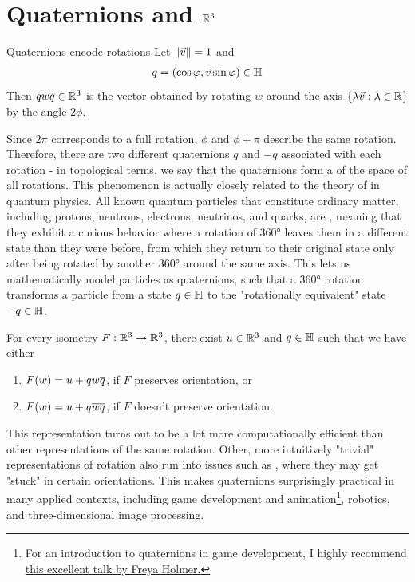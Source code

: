 \section{Quaternions and $\mathbb{R}^3$}
\begin{importanttheorem}{Quaternions encode rotations}{}
	Let $\norm{\vec{v}} = 1$ and
	\begin{align*}
		q = (\cos \varphi, \vec{v} \sin \varphi) \in \mathbb{H}
	\end{align*} 
	Then $q w \overline{{q}} \in \mathbb{R}^3$ is the vector obtained by rotating $w$ around the axis $\qty{\lambda\vec{v}: \lambda \in \mathbb{R}}$ by the angle $2\phi$.
\end{importanttheorem}
Since $2\pi$ corresponds to a full rotation, $\phi$ and $\phi + \pi$ describe the same rotation. Therefore, there are two different quaternions $q$ and $-q$ associated with each rotation - in topological terms, we say that the quaternions form a  of the space of all rotations. 
\newpar
This phenomenon is actually closely related to the theory of  in quantum physics. All known quantum particles that constitute ordinary matter, including protons, neutrons, electrons, neutrinos, and quarks, are , meaning that they exhibit a curious behavior where a rotation of $360$° leaves them in a different state than they were before, from which they return to their original state only after being rotated by another $360$° around the same axis. This lets us mathematically model particles as quaternions, such that a $360$° rotation transforms a particle from a state $q \in \mathbb{H}$ to the "rotationally equivalent" state $-q \in \mathbb{H}$.
\begin{corollary}
	For every isometry $F : \mathbb{R}^3 \to \mathbb{R}^3$, there exist $u \in \mathbb{R}^3$ and $q \in \mathbb{H}$ such that we have either
	\begin{enumerate}
		\item $F(w) = u + q w \overline{{q}}$, if $F$ preserves orientation, or
		\item $F(w) = u + q \overline{{w}} \overline{{q}}$, if $F$ doesn't preserve orientation.
	\end{enumerate}
\end{corollary}
This representation turns out to be a lot more computationally efficient than other representations of the same rotation. Other, more intuitively "trivial" representations of rotation also run into issues such as , where they may get "stuck" in certain orientations.
\newpar
This makes quaternions surprisingly practical in many applied contexts, including game development and animation\footnote{For an introduction to quaternions in game development, I highly recommend \href{https://www.youtube.com/watch?v=PMvIWws8WEo}{this excellent talk by Freya Holmer.}}, robotics, and three-dimensional image processing.
